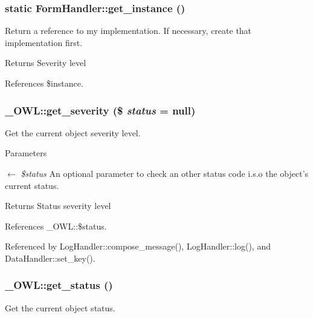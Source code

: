 \subsubsection[{get\_\-instance}]{\setlength{\rightskip}{0pt plus 5cm}static FormHandler::get\_\-instance ()}\label{classFormHandler_ad5b352905583faed17034459f1a9ea6c}
Return a reference to my implementation. If necessary, create that implementation first.

\begin{DoxyReturn}{Returns}
Severity level 
\end{DoxyReturn}


References \$instance.

\subsubsection[{get\_\-severity}]{\setlength{\rightskip}{0pt plus 5cm}\_\-OWL::get\_\-severity (\$ {\em status} = {\ttfamily null})}\label{class__OWL_adf9509ef96858be7bdd9414c5ef129aa}
Get the current object severity level.


\begin{DoxyParams}{Parameters}
\item[\mbox{$\leftarrow$} {\em \$status}]An optional parameter to check an other status code i.s.o the object's current status. \end{DoxyParams}
\begin{DoxyReturn}{Returns}
Status severity level 
\end{DoxyReturn}


References \_\-OWL::\$status.



Referenced by LogHandler::compose\_\-message(), LogHandler::log(), and DataHandler::set\_\-key().

\subsubsection[{get\_\-status}]{\setlength{\rightskip}{0pt plus 5cm}\_\-OWL::get\_\-status ()}\label{class__OWL_a99ec771fa2c5c279f80152cc09e489a8}
Get the current object status.

